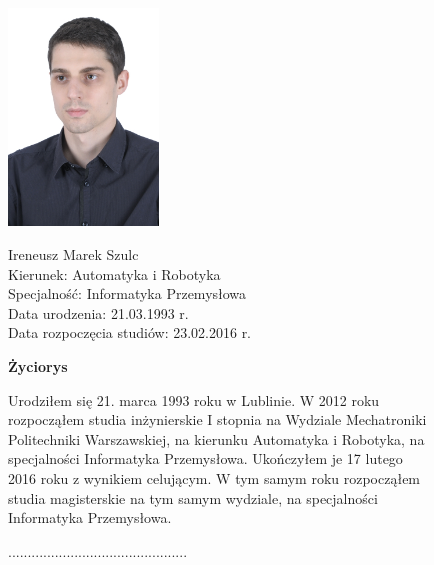 \begin{figure}[ht]
\begin{doublespacing}
	\begin{minipage}[b]{0.4\linewidth}
		\hspace{1cm}
		\includegraphics[width=4cm]{img/cv/me}
	\end{minipage}
	\begin{minipage}[b]{0.5\linewidth}
		Ireneusz Marek Szulc \\
		Kierunek:  Automatyka i Robotyka \\
		Specjalność:  Informatyka Przemysłowa \\
		Data urodzenia:  21.03.1993 r. \\
		Data rozpoczęcia studiów:  23.02.2016 r. \\
	\end{minipage}
	
	\hspace{2cm}
	
	\begin{center}
		\Large{\textbf{Życiorys}} \\
	\end{center}

Urodziłem się 21. marca 1993 roku w Lublinie. W 2012 roku rozpocząłem studia inżynierskie I stopnia na Wydziale Mechatroniki Politechniki Warszawskiej, na kierunku Automatyka i Robotyka, na specjalności Informatyka Przemysłowa. Ukończyłem je 17 lutego 2016 roku z wynikiem celującym. W tym samym roku rozpocząłem studia magisterskie na tym samym wydziale, na specjalności Informatyka Przemysłowa. \\

	\vspace{2cm}
	\begin{flushright}
				.............................................. \\
	\end{flushright}
\end{doublespacing}
\end{figure}


